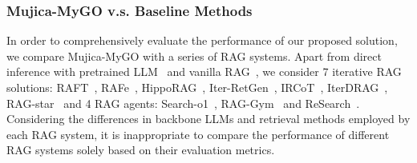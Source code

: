 \subsubsection{\textbf{Mujica-MyGO v.s. Baseline Methods}}
\label{appendix_comparision}
In order to comprehensively evaluate the performance of our proposed solution, we compare Mujica-MyGO with a series of RAG systems. Apart from direct inference with pretrained LLM~\cite{Qwen2} and vanilla RAG~\cite{RAG}, we consider 7 iterative RAG solutions: RAFT~\cite{zhang2024raftadaptinglanguagemodel}, RAFe~\cite{RaFe}, HippoRAG~\cite{gutiérrez2024hipporag}, Iter-RetGen~\cite{Iter-RetRAG}, IRCoT~\cite{IRCoT}, IterDRAG~\cite{IterDRAG}, RAG-star~\cite{RAG-Star} and 4 RAG agents: Search-o1~\cite{Search-o1}, RAG-Gym~\cite{RAG} and ReSearch~\cite{ReSearch}. %
Considering the differences in backbone LLMs and retrieval methods employed by each RAG system, it is inappropriate to compare the performance of different RAG systems solely based on their evaluation metrics.

